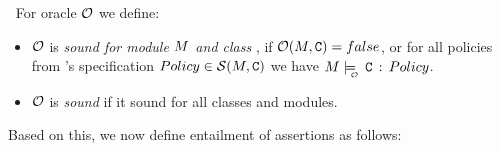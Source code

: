 \begin{definition}
\label{def:C:adheres:to:A}
\label{def:sound:oracle}
 $ ~ $ For oracle ${\cal O}$  we define:

 \noindent

\begin{itemize}
\item  ${\cal O}$ is  {\em sound for  module $M$ and class }, if
  ${\cal O}(M, {\textrm{\ttfamily{C}}})=false$, or for all policies  from 's specification $Policy\in{\cal S}(M,{\textrm{\ttfamily{C}}})$  we have  
$\M  \modelsWithO\  \prg{C}\,:\,Policy$.

\item  ${\cal O}$ is {\em sound} if it sound for all classes   and modules.

\end{itemize}
\end{definition}



Based on this, we now define entailment of assertions as follows:

